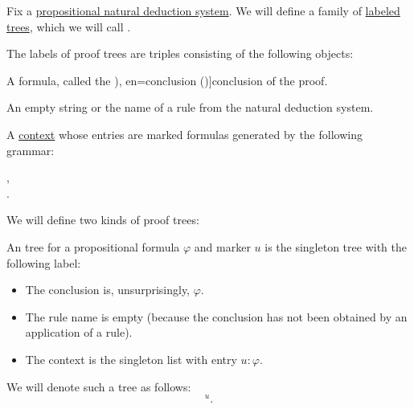 \begin{definition}\label{def:natural_deduction_proof_tree}\mimprovised
  Fix a \hyperref[def:propositional_natural_deduction_system]{propositional natural deduction system}. We will define a family of \hyperref[def:labeled_tree]{labeled trees}, which we will call .

  The labels of proof trees are triples consisting of the following objects:
  \begin{thmenum}[series=def:natural_deduction_proof_tree]
     A formula, called the \term[ru=conclusion (\cite[35]{TroelstraSchwichtenberg2000Proofs}), en=conclusion (\cite[36]{TroelstraSchwichtenberg2000Proofs})]{conclusion} of the proof.

     An empty string or the name of a rule from the natural deduction system.

     A \hyperref[def:logical_context]{context} whose entries are marked formulas generated by the following grammar:
    \begin{bnf*}
                {}, \\
        { \bnfsp \bnftsq{:} \bnfsp {}}.
    \end{bnf*}
  \end{thmenum}

  We will define two kinds of proof trees:
  \begin{thmenum}[resume=def:natural_deduction_proof_tree]
     An  tree for a propositional formula \( \varphi \) and marker \( u \) is the singleton tree with the following label:
    \begin{itemize}
      \item The conclusion is, unsurprisingly, \( \varphi \).
      \item The rule name is empty (because the conclusion has not been obtained by an application of a rule).
      \item The context is the singleton list with entry \( u: \varphi \).
    \end{itemize}

    We will denote such a tree as follows:
    \begin{equation*}
      [\varphi]^u.
    \end{equation*}


\end{thmenum}
\end{definition}
